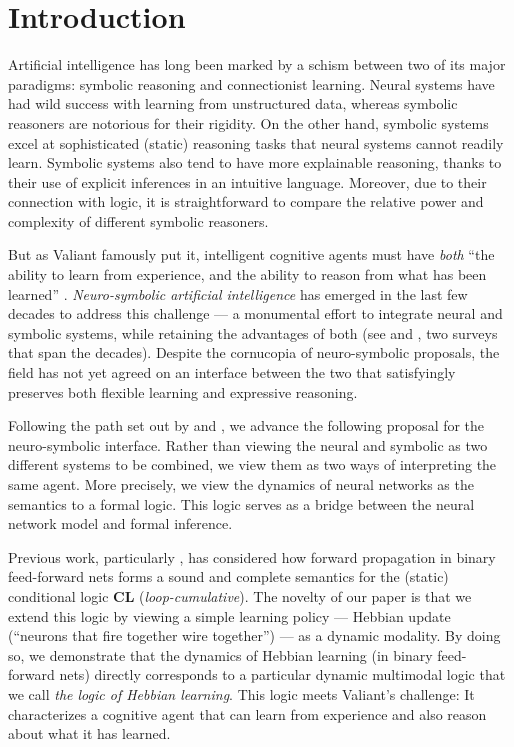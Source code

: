 \documentclass[letterpaper]{article}
\theoremstyle{definition}
\begin{document}
\section{Introduction}

Artificial intelligence  has  long  been  marked  by  a  schism between two of its major paradigms: symbolic reasoning and connectionist learning.  Neural systems have had wild success with learning from unstructured data, whereas symbolic reasoners are notorious for their rigidity.  On the other hand, symbolic systems excel at sophisticated (static) reasoning tasks that neural systems cannot readily learn.  Symbolic systems also tend to have more explainable reasoning, thanks to their use of explicit inferences in an intuitive language.  Moreover, due to their connection with logic, it is straightforward to compare the relative power and complexity of different symbolic reasoners.

But as Valiant famously put it, intelligent cognitive agents must have \emph{both} ``the ability to learn from experience, and the ability to reason from what has been learned'' \cite{valiant2003three}.  \emph{Neuro-symbolic artificial intelligence} has emerged in the last few decades to address this challenge --- a monumental effort to integrate neural and symbolic systems, while retaining the advantages of both (see \cite{bader2005dimensions} and \cite{sarker2021neuro}, two surveys that span the decades).  Despite the cornucopia of neuro-symbolic proposals, the field has not yet agreed on an interface between the two that satisfyingly preserves both flexible learning and expressive reasoning.

Following the path set out by \cite{balkenius1991nonmonotonic} and \cite{leitgeb2001nonmonotonic,leitgeb2003nonmonotonic}, we advance the following proposal for the neuro-symbolic interface.  Rather than viewing the neural and symbolic as two different systems to be combined, we view them as two ways of interpreting the same agent.  More precisely, we view the dynamics of neural networks as the semantics to a formal logic.  This logic serves as a bridge between the neural network model and formal inference.

Previous work, particularly \cite{leitgeb2001nonmonotonic}, has considered how forward propagation in binary feed-forward nets forms a sound and complete semantics for the (static) conditional logic \textbf{CL} (\emph{loop-cumulative}).  The novelty of our paper is that we extend this logic by viewing a simple learning policy --- Hebbian update (``neurons that fire together wire together'') --- as a dynamic modality.  By doing so, we demonstrate that the dynamics of Hebbian learning (in binary feed-forward nets) directly corresponds to a particular dynamic multimodal logic that we call \emph{the logic of Hebbian learning}.
This logic meets Valiant's challenge:  It characterizes a cognitive agent that can learn from experience and also reason about what it has learned.
\end{document}
